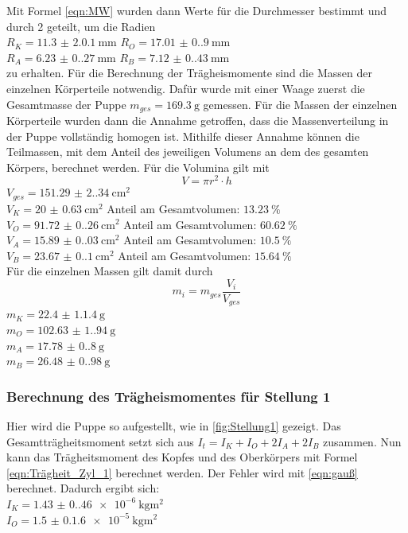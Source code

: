     Mit Formel \ref{eqn:MW} wurden dann Werte für die Durchmesser bestimmt und durch 2 geteilt, um die Radien\\
    $R_K=\qty{11.3(2.01)}{\milli\meter}$ \quad
    $R_O=\qty{17.01(0.90)}{\milli\meter}$\\
    $R_A=\qty{6.23(0.27)}{\milli\meter}$ \quad
    $R_B=\qty{7.12(0.43)}{\milli\meter}$\\
    zu erhalten.
    Für die Berechnung der Trägheismomente sind die Massen der einzelnen Körperteile notwendig.
    Dafür wurde mit einer Waage zuerst die Gesamtmasse der Puppe $m_{ges}=\qty{169.3}{\gram}$ gemessen.
    Für die Massen der einzelnen Körperteile wurden dann die Annahme getroffen, dass die Massenverteilung in der Puppe vollständig homogen ist.
    Mithilfe dieser Annahme können die Teilmassen, mit dem Anteil des jeweiligen Volumens an dem des gesamten Körpers, berechnet werden.
    Für die Volumina gilt mit 
    \begin{equation}
      V=\pi r^2 \cdot h
      \label{eqn:volumen}
    \end{equation}
    $V_{ges}=\qty{151.29(2.34)}{\centi\meter\squared}$\\
    $V_K=\qty{20(0.63)}{\centi\meter\squared}$ Anteil am Gesamtvolumen: $\qty{13.23}{\percent}$\\
    $V_O=\qty{91.72(0.26)}{\centi\meter\squared}$ Anteil am Gesamtvolumen: $\qty{60.62}{\percent}$\\
    $V_A=\qty{15.89(0.03)}{\centi\meter\squared}$ Anteil am Gesamtvolumen: $\qty{10.5}{\percent}$\\
    $V_B=\qty{23.67(0.1)}{\centi\meter\squared}$ Anteil am Gesamtvolumen: $\qty{15.64}{\percent}$\\

    Für die einzelnen Massen gilt damit durch 
    \begin{equation}
      m_i=m_{ges} \frac{V_i}{V_{ges}}
    \end{equation}
    $m_K=\qty{22.4(1.14)}{\gram}$\\
    $m_O=\qty{102.63(1.94)}{\gram}$\\
    $m_A=\qty{17.78(0.8)}{\gram}$\\
    $m_B=\qty{26.48(0.98)}{\gram}$\\

    \subsubsection{Berechnung des Trägheismomentes für Stellung 1}
    Hier wird die Puppe so aufgestellt, wie in \ref{fig:Stellung1} gezeigt.%
    Das Gesamtträgheitsmoment setzt sich aus $I_{t}=I_K+I_O+2I_A+2I_B$ zusammen.
    Nun kann das Trägheitsmoment des Kopfes und des Oberkörpers mit Formel \ref{eqn:Trägheit_Zyl_1} berechnet werden.
    Der Fehler wird mit \ref{eqn:gauß} berechnet.
    Dadurch ergibt sich:\\
    $I_K=\qty{1.43(0.46)e-6}{\kilo\gram\meter\squared}$\\
    $I_O=\qty{1.5(0.16)e-5}{\kilo\gram\meter\squared}$\\
    
